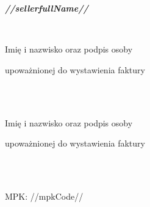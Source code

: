 \documentclass[12pt]{article}
\begin{document}
    \begin{small}
        \begin{minipage}[t]{.4\textwidth}
            \centerline{
                \textbf{\emph{//sellerfullName//}
                }}
            \ \\
            \vspace{-4ex}
            \hline
            \vspace{.5ex}
            \scriptsize{
                \centerline{Imię i nazwisko oraz podpis osoby}
                \centerline{upoważnionej do wystawienia faktury}
            }
        \end{minipage}
        \hfill
        \begin{minipage}[t]{.4\textwidth}
            \ \\ \\
            \vspace{-4ex}
            \hline
            \vspace{.5ex}
            \scriptsize{
                \centerline{Imię i nazwisko oraz podpis osoby}
                \centerline{upoważnionej do wystawienia faktury}
            }
        \end{minipage}

        \ \\
        \ \\

        \begin{small}
            \small{\centerline{{MPK: //mpkCode//}}}
        \end{small}


    \end{small}
\end{document}
